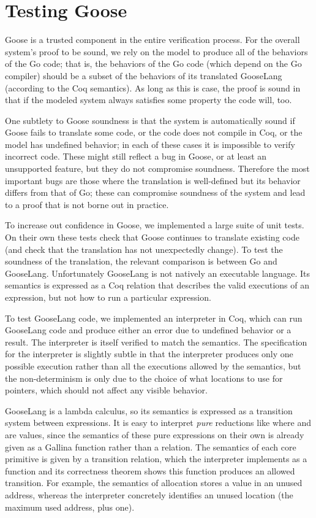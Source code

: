 \section{Testing Goose}%
\label{sec:goose:testing}

Goose is a trusted component in the entire verification process. For the
overall system's proof to be sound, we rely on the model to produce all
of the behaviors of the Go code; that is, the behaviors of the Go code
(which depend on the Go compiler) should be a subset of the behaviors
of its translated GooseLang (according to the Coq semantics). As long as
this is case, the proof is sound in that if the modeled system always
satisfies some property the code will, too.

One subtlety to Goose soundness is that the system is automatically sound if
Goose fails to translate some code, or the code does not compile in Coq, or the
model has undefined behavior; in each of these cases it is impossible to verify
incorrect code. These might still reflect a bug in Goose, or at least an
unsupported feature, but they do not compromise soundness. Therefore the
most important bugs are those where the translation is well-defined but its behavior differs
from that of Go; these can compromise soundness of the system and lead
to a proof that is not borne out in practice.

To increase out confidence in Goose, we implemented a large suite of
unit tests. On their own these tests check that Goose continues to translate
existing code (and check that the translation has not unexpectedly
change). To test the soundness of the translation, the relevant comparison is
between Go and GooseLang. Unfortunately GooseLang is not natively an executable language.
Its semantics is expressed as a Coq relation that describes the valid executions
of an expression, but not how to run a particular expression.

To test GooseLang code, we implemented an interpreter in Coq, which can
run GooseLang code and produce either an error due to undefined behavior
or a result. The interpreter is itself
verified to match the semantics. The specification for the interpreter is slightly
subtle in that the interpreter produces only one possible execution rather than
all the executions allowed by the semantics, but
the non-determinism is only due to the choice of what locations to use
for pointers, which should not affect any visible behavior.

GooseLang is a lambda calculus, so
its semantics is expressed as a transition system between expressions.
It is easy to
interpret \emph{pure} reductions like  where 
and  are values, since the semantics of these pure expressions on their own
is already given as a Gallina function rather than a relation. The semantics of each core primitive is
given by a transition relation, which the interpreter implements as a function
and its correctness theorem shows this function produces an allowed transition.
For example, the semantics of allocation stores a value in an unused address,
whereas the interpreter concretely identifies an unused location (the maximum
used address, plus one).

